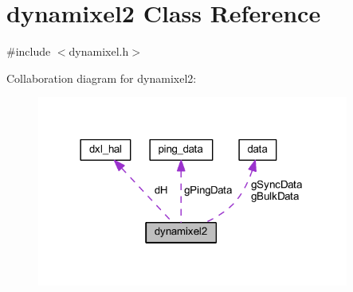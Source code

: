 \hypertarget{classdynamixel2}{}\section{dynamixel2 Class Reference}
\label{classdynamixel2}


{\ttfamily \#include $<$dynamixel.\+h$>$}



Collaboration diagram for dynamixel2\+:\nopagebreak
\begin{figure}[H]
\begin{center}
\leavevmode
\includegraphics[width=290pt]{d6/d1d/classdynamixel2__coll__graph}
\end{center}
\end{figure}
